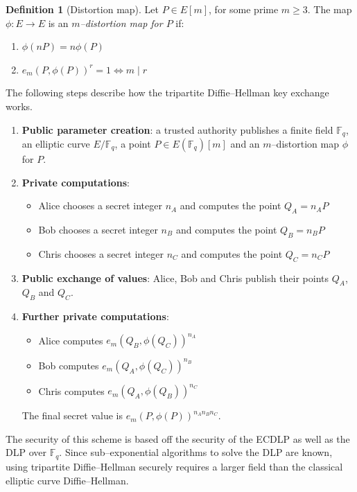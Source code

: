 \documentclass[9pt]{article}
\theoremstyle{definition}
\newtheorem{definition}{Definition}[section]
\begin{document}
\begin{definition}[Distortion map]
    Let $P \in E[m]$, for some prime $m \geq 3$. The map $\phi : E \to E$ is an \textit{$m$--distortion map for $P$} if:
    \begin{enumerate}[label=(\alph*)]
        \item $\phi(nP) = n\phi(P)$
        \item $e_m\left(P, \phi(P)\right)^r = 1 \iff m \;\vert\; r$
    \end{enumerate}
\end{definition}

The following steps describe how the tripartite Diffie--Hellman key exchange works.

\begin{enumerate}[label=\textbf{\arabic*.}]
    \item \textbf{Public parameter creation}: a trusted authority publishes a finite field $\mathbb{F}_q$, an elliptic curve $E/\mathbb{F}_q$, a point $P \in E(\mathbb{F}_q)[m]$ and an $m$--distortion map $\phi$ for $P$.
    \item \textbf{Private computations}:
        \begin{itemize}
            \item Alice chooses a secret integer $n_A$ and computes the point $Q_A = n_A P$
            \item Bob chooses a secret integer $n_B$ and computes the point $Q_B = n_B P$
            \item Chris chooses a secret integer $n_C$ and computes the point $Q_C = n_C P$
        \end{itemize}
    \item \textbf{Public exchange of values}: Alice, Bob and Chris publish their points $Q_A$, $Q_B$ and $Q_C$.
    \item \textbf{Further private computations}: \begin{itemize}
            \item Alice computes $e_m\left(Q_B, \phi\left(Q_C\right)\right)^{n_A}$
            \item Bob computes $e_m\left(Q_A, \phi\left(Q_C\right)\right)^{n_B}$
            \item Chris computes $e_m\left(Q_A, \phi\left(Q_B\right)\right)^{n_C}$
        \end{itemize}
    The final secret value is $e_m\left(P, \phi\left(P\right)\right)^{n_A n_B n_C}$.
\end{enumerate}

The security of this scheme is based off the security of the ECDLP as well as the DLP over $\mathbb{F}_q$. Since sub--exponential algorithms to solve the DLP are known, using tripartite Diffie--Hellman securely requires a larger field than the classical elliptic curve Diffie--Hellman.
\end{document}

